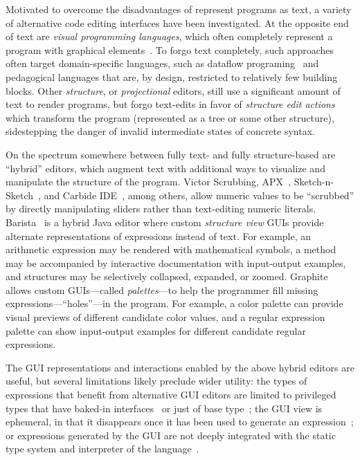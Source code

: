 Motivated to overcome the disadvantages of represent programs as text, a variety
of alternative code editing interfaces have been investigated.
%
At the opposite end of text are \emph{visual programming languages}, which often
completely represent a program with graphical elements~\citep{XXX}.
%
To forgo text completely, such approaches often target domain-specific
languages, such as dataflow programing~\citep{XXX} and pedagogical languages
that are, by design, restricted to relatively few building blocks.
%
Other \emph{structure}, or \emph{projectional} editors, still use a significant
amount of text to render programs, but forgo text-edits in favor of
\emph{structure edit actions} which transform the program (represented as a tree
or some other structure), sidestepping the danger of invalid intermediate states
of concrete syntax.

On the spectrum somewhere between fully text- and fully structure-based are
``hybrid'' editors, which augment text with additional ways to visualize and
manipulate the structure of the program.
%
Victor Scrubbing, APX~\citep{APX}, Sketch-n-Sketch~\citep{sns-pldi}, and Carbide
IDE~\citep{XXX}, among others, allow numeric values to be ``scrubbed'' by
directly manipulating sliders rather than text-editing numeric literals.
%
Barista~\cite{Barista} is a hybrid Java editor where custom \emph{structure
view} GUIs provide alternate representations of expressions instead of text.
%
For example, an arithmetic expression may be rendered with mathematical symbols,
a method may be accompanied by interactive documentation with input-output
examples, and structures may be selectively collapsed, expanded, or zoomed.
%
Graphite~\citep{Graphite} allows custom GUIs---called \emph{palettes}---to help
the programmer fill missing expressions---``holes''---in the program.
%
For example, a color palette can provide visual previews of different candidate
color values, and a regular expression palette can show input-output examples
for different candidate regular expressions.

The GUI representations and interactions enabled by the above hybrid editors are
useful, but several limitations likely preclude wider utility:
%
the types of expressions that benefit from alternative GUI editors are limited
to
%
privileged types that have baked-in interfaces~\citep{XXX}
%
or just of base type~\citep{XXX};
%
the GUI view is ephemeral, in that it disappears once it has been used to
generate an expression~\citep{XXX}; or
%
expressions generated by the GUI are not deeply integrated with the static type
system and interpreter of the language~\citep{XXX,XXX,XXX}.


